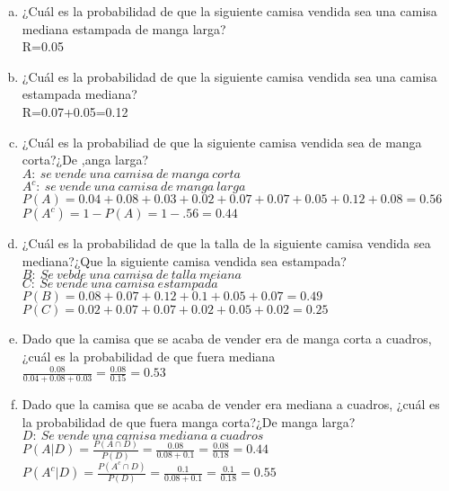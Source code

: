 \documentclass[12pt, letterpaper, spanish]{article}
\begin{document}
\begin{enumerate}[a)]
    \item ¿Cuál es la probabilidad de que la siguiente camisa vendida sea una camisa mediana estampada de manga larga?\\
    R=0.05
    \item ¿Cuál es la probabilidad de que la siguiente camisa vendida sea una camisa estampada mediana?\\
    R=0.07+0.05=0.12
    \item ¿Cuál es la probabiliad de que la siguiente camisa vendida sea de manga corta?¿De ,anga larga?\\
    $A:\ se\ vende\ una\ camisa\ de\ manga\ corta$\\
    $A^c:\ se\ vende\ una\ camisa\ de\ manga\ larga$\\
    $P(A)=0.04+0.08+0.03+0.02+0.07+0.07+0.05+0.12+0.08=0.56$\\
    $P(A^c)=1-P(A)=1-.56=0.44$
    \item ¿Cuál es la probabilidad de que la talla de la siguiente camisa vendida sea mediana?¿Que la siguiente camisa vendida sea estampada?\\
    $B:\ Se\ vebde\ una\ camisa\ de\ talla\ meiana$\\
    $C:\ Se\ vende\ una\ camisa\ estampada$\\
    $P(B)=0.08+0.07+0.12+0.1+0.05+0.07=0.49$\\
    $P(C)=0.02+0.07+0.07+0.02+0.05+0.02=0.25$
    \item Dado que la camisa que se acaba de vender era de manga corta a cuadros, ¿cuál es la probabilidad de que fuera mediana\\
    $\displaystyle\frac{0.08}{0.04+0.08+0.03}=\displaystyle\frac{0.08}{0.15}=0.53$
    \item Dado que la camisa que se acaba de vender era mediana a cuadros, ¿cuál es la probabilidad de que fuera manga corta?¿De manga larga?\\
    $D:\ Se\ vende\ una\ camisa\ mediana\ a\ cuadros$\\
    $P(A|D)=\displaystyle\frac{P(A\cap D)}{P(D)}=\displaystyle\frac{0.08}{0.08+0.1}=\displaystyle\frac{0.08}{0.18}=0.44$\\
    $P(A^c|D)=\displaystyle\frac{P(A^c\cap D)}{P(D)}=\displaystyle\frac{0.1}{0.08+0.1}=\displaystyle\frac{0.1}{0.18}=0.55$
\end{enumerate}
\end{document}
